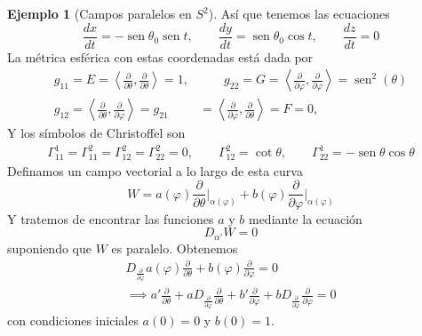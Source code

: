 \documentclass[spanish]{book}
\theoremstyle{definition}
\newtheorem*{ejem}{Ejemplo}
\DeclareMathOperator{\sen}{sen}
\begin{document}
\begin{ejem}[Campos paralelos en $S^2$]
		Así que tenemos las ecuaciones
		\[\frac{dx}{dt}=-\sen\theta_0\sen t,\qquad\frac{dy}{dt}=\sen\theta_0\cos t,\qquad\frac{dz}{dt}=0\]
	La métrica esférica con estas coordenadas está dada por
		\begin{align*}
		g_{11}=E=\left\langle \frac{\partial}{\partial \theta},\frac{\partial}{\partial \theta}\right\rangle=1,&\qquad g_{22}=G=\left\langle \frac{\partial}{\partial \varphi},\frac{\partial}{\partial \varphi}\right\rangle=\sen^2(\theta)\\
		g_{12}=\left\langle \frac{\partial}{\partial \theta},\frac{\partial}{\partial \varphi}\right\rangle=g_{21}&=\left\langle \frac{\partial}{\partial \varphi},\frac{\partial}{\partial \theta}\right\rangle=F=0,
	\end{align*}
	Y los símbolos de Christoffel son
	\begin{align*}
		\Gamma_{11}^1=\Gamma^2_{11}=\Gamma^2_{12}=\Gamma_{22}^2=0,		\qquad \Gamma_{12}^2=\cot\theta,\qquad\Gamma^1_{22}=-\sen\theta\cos\theta
	\end{align*}
	Definamos un campo vectorial a lo largo de esta curva
	\[W=a(\varphi)\frac{\partial}{\partial\theta}\Big|_{\alpha(\varphi)}+b(\varphi)\frac{\partial}{\partial \varphi}\Big|_{\alpha(\varphi)}\]
	Y tratemos de encontrar las funciones $a$ y $b$ mediante la ecuación
	\[D_{\alpha'}W=0\]
	suponiendo que $W$ es paralelo. Obtenemos
	\begin{align*}
		D_{\frac{\partial}{\partial\varphi}}a(\varphi)\frac{\partial}{\partial\theta}+b(\varphi)\frac{\partial}{\partial\varphi}=0\\
		\implies a'\frac{\partial}{\partial\theta}+aD_{\frac{\partial}{\partial \varphi}}\frac{\partial}{\partial \theta}+b'\frac{\partial}{\partial\varphi}+bD_{\frac{\partial}{\partial \varphi}}\frac{\partial}{\partial\varphi}=0
	\end{align*}
	con condiciones iniciales $a(0)=0$ y $b(0)=1$.
	

\end{ejem}
\end{document}
